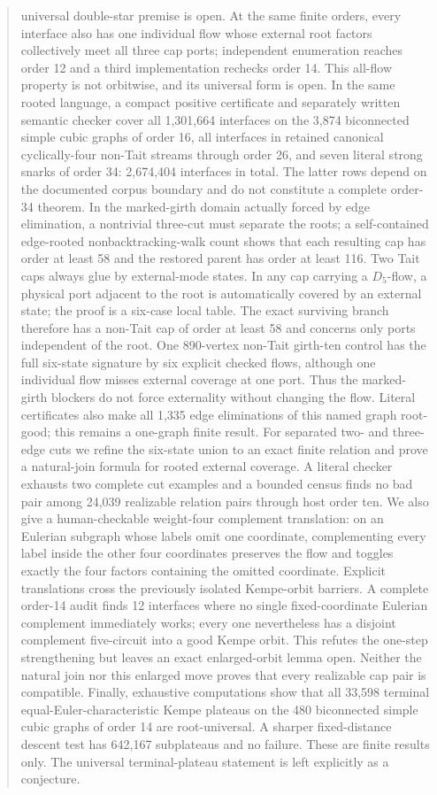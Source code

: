 \documentclass[11pt]{article}
\theoremstyle{definition}
\theoremstyle{remark}
\begin{document}
\begin{abstract}
universal double-star premise is open.  At the same finite orders, every
interface also has one individual flow whose external root factors
collectively meet all three cap ports; independent enumeration reaches
order 12 and a third implementation rechecks order 14.  This all-flow
property is not orbitwise, and its universal form is open.  In the
same rooted language, a compact positive certificate and separately written
semantic checker cover all 1,301,664 interfaces on the 3,874 biconnected
simple cubic graphs of order 16, all interfaces in retained canonical
cyclically-four non-Tait streams through order 26, and seven literal strong
snarks of order 34: 2,674,404 interfaces in total.  The latter rows depend
on the documented corpus boundary and do not constitute a complete
order-34 theorem.  In the
marked-girth domain actually
forced by edge elimination, a nontrivial three-cut must separate the roots;
a self-contained edge-rooted nonbacktracking-walk count shows that each
resulting cap has order at least 58 and the restored parent has order at
least 116.  Two Tait caps always glue
by external-mode states.  In any cap carrying a \(D_5\)-flow, a physical
port adjacent to the root is automatically covered by an external state;
the proof is a six-case local table.  The exact surviving branch therefore
has a non-Tait cap of order at least 58 and concerns only ports independent
of the root.  One 890-vertex non-Tait girth-ten
control has the full six-state signature by six explicit checked flows,
although one individual flow misses external coverage at one port.  Thus
the marked-girth blockers do not force externality without changing the
flow.  Literal certificates also make all 1,335 edge eliminations of this
named graph root-good; this remains a one-graph finite result.
For separated two- and three-edge cuts we refine the six-state union to an
exact finite relation and prove a natural-join formula for rooted external
coverage.  A literal checker exhausts two complete cut examples and a
bounded census finds no bad pair among 24,039 realizable relation pairs
through host order ten.  We also give a human-checkable weight-four
complement translation: on an Eulerian subgraph whose labels omit one
coordinate, complementing every label inside the other four coordinates
preserves the flow and toggles exactly the four factors containing the
omitted coordinate.  Explicit translations cross the previously isolated
Kempe-orbit barriers.  A complete order-14 audit finds 12 interfaces where
no single fixed-coordinate Eulerian complement immediately works; every one
nevertheless has a disjoint complement five-circuit into a good Kempe orbit.
This refutes the one-step strengthening but leaves an exact enlarged-orbit
lemma open.  Neither the natural join nor this enlarged move proves that
every realizable cap pair is compatible.
Finally,
exhaustive computations show that all 33,598 terminal
equal-Euler-characteristic Kempe plateaus on the 480 biconnected simple
cubic graphs of order 14 are root-universal.  A sharper fixed-distance
descent test has 642,167 subplateaus and no failure.  These are finite
results only.  The universal terminal-plateau statement is left
explicitly as a conjecture.
\end{abstract}
\end{document}
